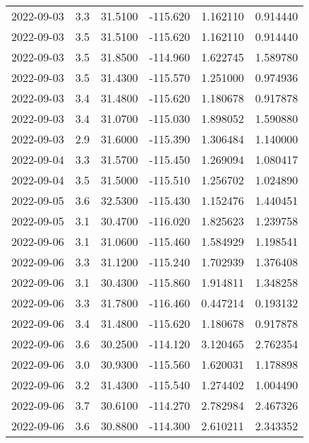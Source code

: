 \begin{tabular}{lrrrrr}
2022-09-03 &       3.3 &  31.5100 &  -115.620 &         1.162110 &         0.914440 \\
2022-09-03 &       3.5 &  31.5100 &  -115.620 &         1.162110 &         0.914440 \\
2022-09-03 &       3.5 &  31.8500 &  -114.960 &         1.622745 &         1.589780 \\
2022-09-03 &       3.5 &  31.4300 &  -115.570 &         1.251000 &         0.974936 \\
2022-09-03 &       3.4 &  31.4800 &  -115.620 &         1.180678 &         0.917878 \\
2022-09-03 &       3.4 &  31.0700 &  -115.030 &         1.898052 &         1.590880 \\
2022-09-03 &       2.9 &  31.6000 &  -115.390 &         1.306484 &         1.140000 \\
2022-09-04 &       3.3 &  31.5700 &  -115.450 &         1.269094 &         1.080417 \\
2022-09-04 &       3.5 &  31.5000 &  -115.510 &         1.256702 &         1.024890 \\
2022-09-05 &       3.6 &  32.5300 &  -115.430 &         1.152476 &         1.440451 \\
2022-09-05 &       3.1 &  30.4700 &  -116.020 &         1.825623 &         1.239758 \\
2022-09-06 &       3.1 &  31.0600 &  -115.460 &         1.584929 &         1.198541 \\
2022-09-06 &       3.3 &  31.1200 &  -115.240 &         1.702939 &         1.376408 \\
2022-09-06 &       3.1 &  30.4300 &  -115.860 &         1.914811 &         1.348258 \\
2022-09-06 &       3.3 &  31.7800 &  -116.460 &         0.447214 &         0.193132 \\
2022-09-06 &       3.4 &  31.4800 &  -115.620 &         1.180678 &         0.917878 \\
2022-09-06 &       3.6 &  30.2500 &  -114.120 &         3.120465 &         2.762354 \\
2022-09-06 &       3.0 &  30.9300 &  -115.560 &         1.620031 &         1.178898 \\
2022-09-06 &       3.2 &  31.4300 &  -115.540 &         1.274402 &         1.004490 \\
2022-09-06 &       3.7 &  30.6100 &  -114.270 &         2.782984 &         2.467326 \\
2022-09-06 &       3.6 &  30.8800 &  -114.300 &         2.610211 &         2.343352 \\

\end{tabular}
